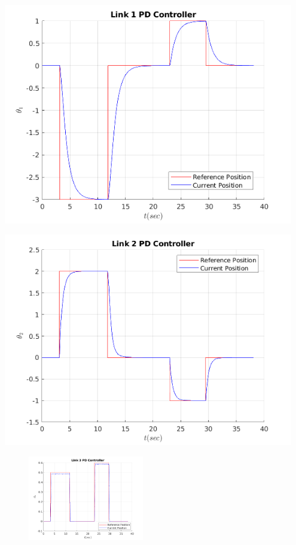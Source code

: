 \documentclass[10pt]{article}
\begin{document}
\begin{enumerate}
	\begin{minipage}[H]{0.45\textwidth}
		\centering
		\includegraphics[width=0.95\textwidth]{figures/link1-pd-plot1.png}
	\end{minipage}
	\begin{minipage}[H]{0.45\textwidth}
		\centering
		\includegraphics[width=0.95\textwidth]{figures/link2-pd-plot1.png}
	\end{minipage}

	\begin{figure}[H]
		\centering
		\includegraphics[width=0.45\textwidth]{figures/link3-pd-plot1.png}
	\end{figure}
	

\end{enumerate}
\end{document}
